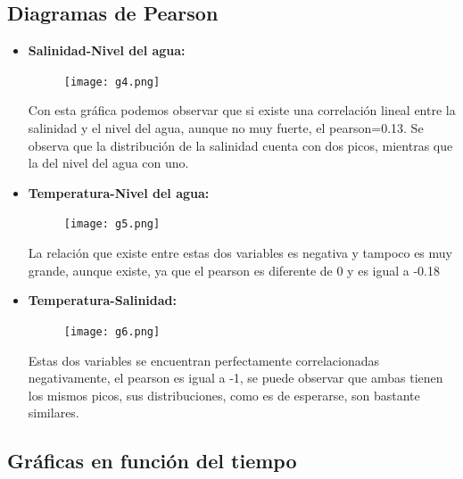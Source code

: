 \documentclass[12pt]{article}
\begin{document}
\subsection{Diagramas de Pearson}

\begin{itemize}
\item \textbf{Salinidad-Nivel del agua:}

\begin{figure}[h!]
  \texttt{[image: g4.png]}
  \centering
  \label{fig:g4}
\end{figure}

Con esta gráfica podemos observar que si existe una correlación lineal entre la salinidad y el nivel del agua, aunque no muy fuerte, el pearson=0.13. Se observa que la distribución de la salinidad cuenta con dos picos, mientras que la del nivel del agua con uno. 

\item\textbf{Temperatura-Nivel del agua:}

\begin{figure}[h!]
  \texttt{[image: g5.png]}
  \centering
  \label{fig:g5}
\end{figure}

La relación que existe entre estas dos variables es negativa y tampoco es muy grande, aunque existe, ya que el pearson es diferente de 0 y es igual a -0.18

\item \textbf{Temperatura-Salinidad:}

\begin{figure}[h!]
  \texttt{[image: g6.png]}
  \centering
  \label{fig:g6}
\end{figure}

Estas dos variables se encuentran perfectamente correlacionadas negativamente, el pearson es igual a -1, se puede observar que ambas tienen los mismos picos, sus distribuciones, como es de esperarse, son bastante similares. 

\end{itemize}

\subsection{Gráficas en función del tiempo}
\end{document}

